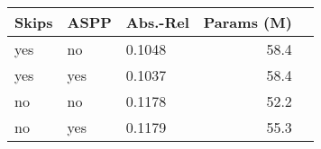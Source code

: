 \begin{tabular}{lllrr}
\toprule
Skips & ASPP &  Abs.-Rel &    Params (M) \\
\midrule
  yes &   no &    0.1048 &  58.4 \\
  yes &  yes &    0.1037 &  58.4 \\
no &   no &    0.1178 &  52.2 \\
no &  yes &    0.1179 &  55.3 \\
\bottomrule
\end{tabular}
